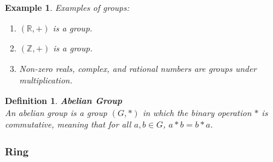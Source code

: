\documentclass[11pt]{book} %
\newtheorem{definition}{Definition}[section]
\newtheorem*{example*}{Example}
\begin{document}
\begin{example*}
Examples of groups:
\begin{enumerate}
\item \( (\mathbb{R}, +) \) is a group.
\item \( (\mathbb{Z}, +) \) is a group.
\item Non-zero reals, complex, and rational numbers are groups under multiplication.
\end{enumerate}
\end{example*}

\begin{definition}{\textbf{Abelian Group}} \\
    An abelian group is a group \( (G, *) \) in which the binary operation \( * \) is commutative, 
    meaning that for all \(a, b \in G\), \(a * b = b * a\).
\end{definition}

\subsubsection{Ring}
\end{document}
